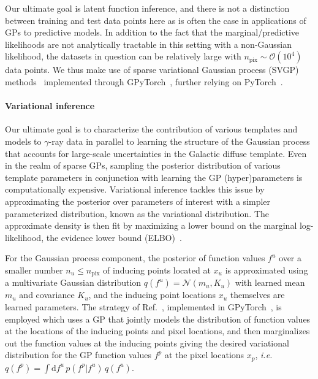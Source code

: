 \documentclass[]{article}
\begin{document}
Our ultimate goal is latent function inference, and there is not a distinction between training and test data points here as is often the case in applications of GPs to predictive models. In addition to the fact that the marginal/predictive likelihoods are not analytically tractable in this setting with a non-Gaussian likelihood, the datasets in question can be relatively large with $n_\mathrm{pix} \sim\mathcal{O}(10^4)$ data points. We thus make use of sparse variational Gaussian process (SVGP) methods~\cite{pmlr-v5-titsias09a,quinonero-candela_unifying_2005,JMLR:v18:16-579} implemented through GPyTorch~\cite{gardner2018gpytorch}, further relying on PyTorch~\cite{NEURIPS2019_9015}.

\paragraph{Variational inference}

Our ultimate goal is to characterize the contribution of various templates and models to $\gamma$-ray data in parallel to learning the structure of the Gaussian process that accounts for large-scale uncertainties in the Galactic diffuse template. Even in the realm of sparse GPs, sampling the posterior distribution of various template parameters in conjunction with learning the GP (hyper)parameters is computationally expensive. Variational inference tackles this issue by approximating the posterior over parameters of interest with a simpler parameterized distribution, known as the variational distribution. The approximate density is then fit by maximizing a lower bound on the marginal log-likelihood, the evidence lower bound (ELBO)~\cite{wingate_automated_2013,hoffman2013stochastic}. 

For the Gaussian process component, the posterior of function values $f^u$ over a smaller number $n_u \leq n_\mathrm{pix}$ of inducing points located at $x_u$ is approximated using a multivariate Gaussian distribution $q(f^{u})=\mathcal N(m_u, K_u)$ with learned mean $m_u$ and covariance $K_u$, and the inducing point locations $x_u$ themselves are learned parameters. 
The strategy of Ref.~\cite{10.5555/3023638.3023667,pmlr-v38-hensman15}, implemented in GPyTorch~\cite{gardner2018gpytorch}, is employed which uses a GP that jointly models the distribution of function values at the locations of the inducing points and pixel locations, and then marginalizes out the function values at the inducing points giving the desired variational distribution for the GP function values $f^{p}$ at the pixel locations $x_{p}$, \emph{i.e.} $q(f^{p}) = \int  \mathrm{d}f^{u}\, p(f^{p} | f^{u})\,q(f^{u})$.
\end{document}
